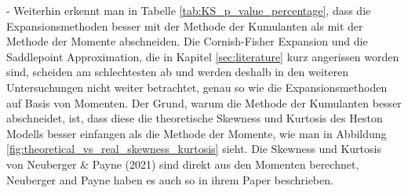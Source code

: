 - Weiterhin erkennt man in Tabelle \ref{tab:KS_p_value_percentage}, dass die Expansionsmethoden besser mit der Methode der Kumulanten als mit der Methode der Momente abschneiden. Die Cornish-Fisher Expansion und die Saddlepoint Approximation, die in Kapitel \ref{sec:literature} kurz angerissen worden sind, scheiden am schlechtesten ab und werden deshalb in den weiteren Untersuchungen nicht weiter betrachtet, genau so wie die Expansionsmethoden auf Basis von Momenten. Der Grund, warum die Methode der Kumulanten besser abschneidet, ist, dass diese die theoretische Skewness und Kurtosis des Heston Modells besser einfangen als die Methode der Momente, wie man in Abbildung \ref{fig:theoretical_vs_real_skewness_kurtosis} sieht. Die Skewness und Kurtosis von Neuberger \& Payne (2021) sind direkt aus den Momenten berechnet, Neuberger and Payne haben es auch so in ihrem Paper beschrieben. %

